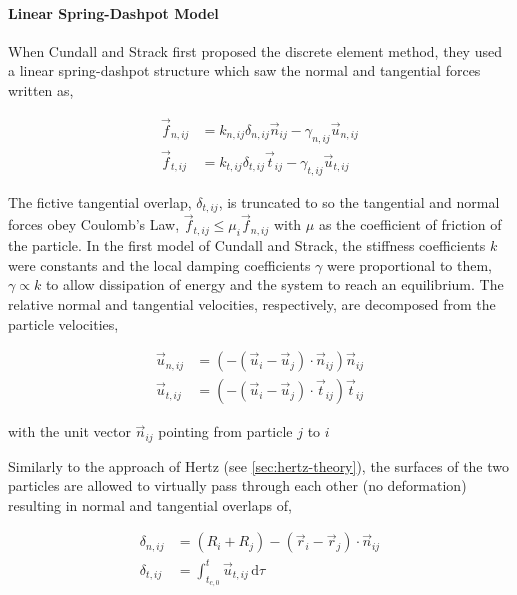 \paragraph{Linear Spring-Dashpot Model}

When Cundall and Strack first proposed the discrete element method, they used a linear spring-dashpot structure which saw the normal and tangential forces written as,

\begin{subequations}
\label{eq:dem-forces}
\begin{align}
	\vec{f}_{n,ij} &= k_{n,ij} \delta_{n,ij}\vec{n}_{ij} - \gamma_{n,ij} \vec{u}_{n,ij} 	\label{eq:normal-force} \\
	\vec{f}_{t,ij} &= k_{t,ij} \delta_{t,ij}\vec{t}_{ij} - \gamma_{t,ij} \vec{u}_{t,ij} 	\label{eq:tangential-force}
\end{align}
\end{subequations}

The fictive tangential overlap, $\delta_{t,ij}$, is truncated to so the tangential and normal forces obey Coulomb's Law, $\vec{f}_{t,ij} \le \mu_i \vec{f}_{n,ij}$ with $\mu$ as the coefficient of friction of the particle. In the first model of Cundall and Strack, the stiffness coefficients $k$ were constants and the local damping coefficients $\gamma$ were proportional to them, $\gamma \propto k$ to allow dissipation of energy and the system to reach an equilibrium. The relative normal and tangential velocities, respectively, are decomposed from the particle velocities,

\begin{subequations}
\label{eq:dem-velocities}
\begin{align}
	\vec{u}_{n,ij} &= (-(\vec{u}_i-\vec{u}_j)\cdot\vec{n}_{ij})\vec{n}_{ij} \\
	\vec{u}_{t,ij} &= (-(\vec{u}_i-\vec{u}_j)\cdot\vec{t}_{ij})\vec{t}_{ij}
\end{align}
\end{subequations}

with the unit vector $\vec{n}_{ij}$ pointing from particle $j$ to $i$

Similarly to the approach of Hertz (see \cref{sec:hertz-theory}), the surfaces of the two particles are allowed to virtually pass through each other (no deformation) resulting in normal and tangential overlaps of,

\begin{subequations}
\label{eq:dem-overlaps}
\begin{align}
	\delta_{n,ij} &= (R_i + R_j) - (\vec{r}_i -\vec{r}_j)\cdot \vec{n}_{ij} \\
	\delta_{t,ij} &= \int_{t_{c,0}}^{t} \vec{u}_{t,ij}\,\mathrm{d}\tau 
\end{align}
\end{subequations}


